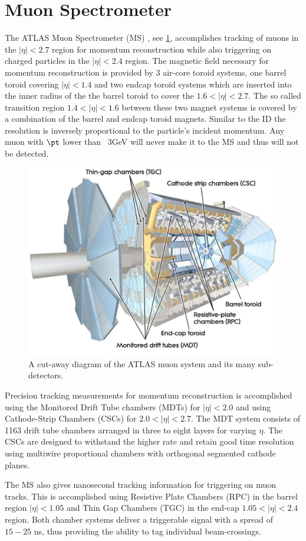\section{Muon Spectrometer} \label{sec:atlas:muons}

The ATLAS Muon Spectrometer (MS) \cite{PERF-2007-01}, see
\cref{fig:muon_system}, accomplishes tracking of muons in the $|\eta|
< 2.7$ region for momentum reconstruction while also triggering on
charged particles in the $|\eta| < 2.4$ region.  The magnetic field necessary
for momentum reconstruction is provided by 3 air-core toroid systems, one
barrel toroid covering $|\eta| < 1.4$ and two endcap toroid systems which are
inserted into the inner radius of the the barrel toroid to cover the $1.6 <
|\eta| < 2.7$. The so called transition region $1.4 < |\eta| < 1.6$ between
these two magnet systems is covered by a combination of the barrel and endcap
toroid magnets.  Similar to the ID the resolution is inversely proportional to
the particle's incident momentum.  Any muon with $\pt$ lower than ~3GeV will never
make it to the MS and thus will not be detected.  

\begin{figure}[!htbp]
  \begin{center}
    \includegraphics[width=0.8\linewidth]{figures/atlas/muon_system}
    \caption{ \cite{PERF-2007-01} A cut-away diagram of the ATLAS muon system
and its many sub-detectors.}
    \label{fig:muon_system}
  \end{center}
\end{figure}

Precision tracking measurements for momentum reconstruction is accomplished
using the Monitored Drift Tube chambers (MDTs) for $|\eta| < 2.0$ and using
Cathode-Strip Chambers (CSCs) for $2.0 < |\eta| < 2.7$.  The MDT system consists of
1163 drift tube chambers arranged in three to eight layers for varying $\eta$.
The CSCs are designed to withstand the higher rate and retain good time
resolution using multiwire proportional chambers with orthogonal segmented
cathode planes.

The MS also gives nanosecond tracking information for triggering on muon tracks.
This is accomplished using Resistive Plate Chambers (RPC) in the barrel region
$|\eta| < 1.05$ and Thin Gap Chambers (TGC) in the end-cap $1.05 < |\eta| < 2.4$
region.  Both chamber systems deliver a triggerable signal with a spread of
$15-25$ ns, thus providing the ability to tag individual beam-crossings.
